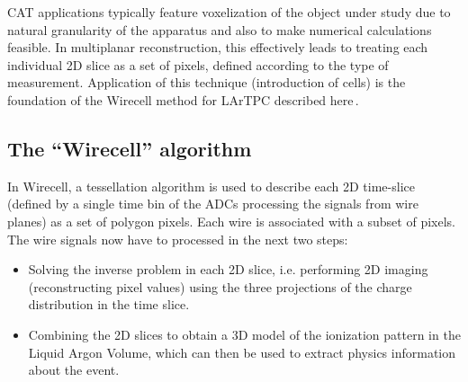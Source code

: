 \documentclass[a4paper]{jpconf}
\begin{document}
CAT applications typically feature voxelization of the object under study due to natural granularity of the apparatus and also to make numerical
calculations feasible. In multiplanar reconstruction, this effectively leads to treating each individual 2D slice as a set of pixels, defined according
to the type of measurement. Application of this technique (introduction of cells) is the foundation of the Wirecell method
for LArTPC
described here\,\cite{wirecell}.


\subsection{The ``Wirecell'' algorithm}
In Wirecell, a tessellation algorithm is used to describe each 2D time-slice (defined by a single time bin of the ADCs processing the signals
from wire planes) as a set of polygon pixels. Each wire is associated with a subset of pixels.
The wire signals now have to processed in the next two steps: 
\begin{itemize}
\item Solving the inverse problem in each 2D slice, i.e. performing 2D imaging (reconstructing pixel values) using the three projections of the
charge distribution in the time slice.
\item Combining the 2D slices to obtain a 3D model of the ionization pattern in the Liquid Argon Volume, which can then be used to extract
physics information about the event.
\end{itemize}
\end{document}

